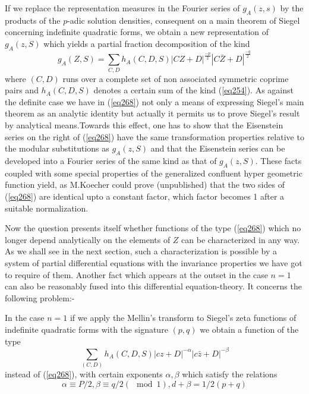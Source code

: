 If we replace the representation measures in the Fourier series of
$g_A(z,s)$ by the products of the $p$-adic solution densities,
consequent on a main theorem of Siegel concerning indefinite quadratic
forms, we obtain a new representation of $g_A(z,S)$ which yields a
partial fraction decomposition of the kind 
\begin{equation*}
g_A(Z,S)=\sum_{C,D}h_A(C,D,S)|CZ+D|^{\frac{-p}{2}}| C \bar{Z} +
D|^{\frac{-q}{2}} \tag{268}\label{eq268}  
\end{equation*}
where $(C, D)$ runs over a complete set of non associated symmetric
coprime pairs and $h_A(C,D,S)$ denotes a certain sum of the kind
(\ref{eq254}). As against the definite case we have in (\ref{eq268})
not only a 
means of expressing Siegel's main theorem as an analytic identity but
actually it permits us to prove Siegel's result by analytical
means.\pageoriginale Towards this effect, one has to show that the
Eisenstein series 
on the right of (\ref{eq268}) have the same transformation properties
relative to the modular substitutions as $g_A(z,S)$ and that the
Eisenstein series can be developed into a Fourier series of the same 
kind as that of $g_A(z,S)$. These facts coupled with some special
properties of the generalized confluent hyper geometric function
yield, as M.Koecher could prove (unpublished) that the two sides of
(\ref{eq268}) are identical upto a constant factor, which factor becomes
1 after a suitable normalization. 

Now the question presents itself whether functions of the type (\ref{eq268})
which no longer depend analytically on the elements of $Z$ can be
characterized in any way. As we shall see in the next section, such a
characterization is possible by a system of partial differential
equations with the invariance properties we have got to require of
them. Another fact which appears at the outset in the case $n=1$ can
also be reasonably fused into this differential equation-theory. It
concerns the following problem:- 

In the case $n=1$ if we apply the Mellin's transform to Siegel's zeta
functions of indefinite quadratic forms with the signature $(p,q)$ we
obtain a function of the type 
\begin{equation*}
\sum_{(C,D)}h_A(C,D,S)|cz+D|^{-\alpha}|c\bar{z}+D|^{-\beta}
\tag{269}\label{eq269}   
\end{equation*}
instead of (\ref{eq268}), with certain exponents $\alpha,\beta$ which
satisfy the relations 
$$
\alpha \equiv P/2, \beta \equiv q/2 (\mod 1), d+\beta = 1/2 (p+q)  
$$

